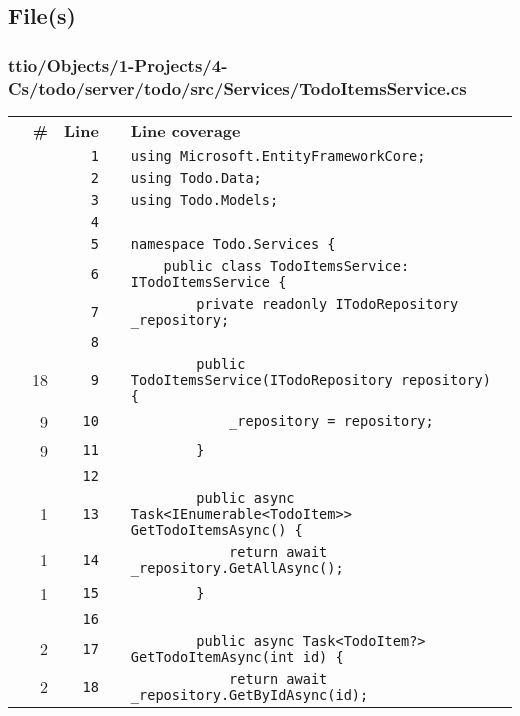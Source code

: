 \documentclass[a4paper,landscape,10pt]{article}
\begin{document}
\subsection{File(s)}
\subsubsection{ttio/Objects/1-Projects/4-Cs/todo/server/todo/src/Services/TodoItemsService.cs}
\begin{longtable}[l]{lrrll}
\textbf{} & \textbf{\#} & \textbf{Line} & \textbf{} & \textbf{Line coverage}\\
\cellcolor{gray} &  & \verb~1~ & & \verb~using Microsoft.EntityFrameworkCore;~\\
\cellcolor{gray} &  & \verb~2~ & & \verb~using Todo.Data;~\\
\cellcolor{gray} &  & \verb~3~ & & \verb~using Todo.Models;~\\
\cellcolor{gray} &  & \verb~4~ & & \verb~~\\
\cellcolor{gray} &  & \verb~5~ & & \verb~namespace Todo.Services {~\\
\cellcolor{gray} &  & \verb~6~ & & \verb~    public class TodoItemsService: ITodoItemsService {~\\
\cellcolor{gray} &  & \verb~7~ & & \verb~        private readonly ITodoRepository _repository;~\\
\cellcolor{gray} &  & \verb~8~ & & \verb~~\\
\cellcolor{green} & 18 & \verb~9~ & & \verb~        public TodoItemsService(ITodoRepository repository) {~\\
\cellcolor{green} & 9 & \verb~10~ & & \verb~            _repository = repository;~\\
\cellcolor{green} & 9 & \verb~11~ & & \verb~        }~\\
\cellcolor{gray} &  & \verb~12~ & & \verb~~\\
\cellcolor{green} & 1 & \verb~13~ & & \verb~        public async Task<IEnumerable<TodoItem>> GetTodoItemsAsync() {~\\
\cellcolor{green} & 1 & \verb~14~ & & \verb~            return await _repository.GetAllAsync();~\\
\cellcolor{green} & 1 & \verb~15~ & & \verb~        }~\\
\cellcolor{gray} &  & \verb~16~ & & \verb~~\\
\cellcolor{green} & 2 & \verb~17~ & & \verb~        public async Task<TodoItem?> GetTodoItemAsync(int id) {~\\
\cellcolor{green} & 2 & \verb~18~ & & \verb~            return await _repository.GetByIdAsync(id);~\\

\end{longtable}
\end{document}
